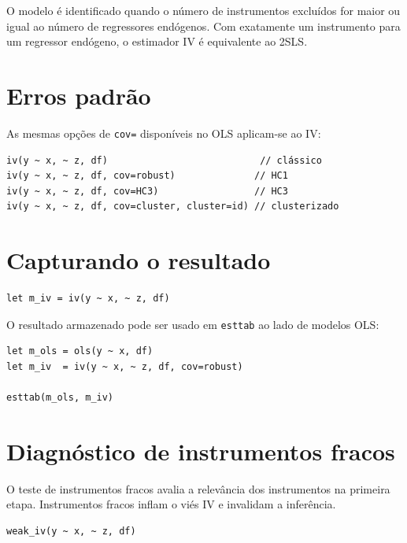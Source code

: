 \begin{nota}
  O modelo é identificado quando o número de instrumentos excluídos for maior ou
  igual ao número de regressores endógenos. Com exatamente um instrumento para um
  regressor endógeno, o estimador IV é equivalente ao 2SLS.
\end{nota}

\section{Erros padrão}

As mesmas opções de \lstinline{cov=} disponíveis no OLS aplicam-se ao IV:

\begin{lstlisting}
iv(y ~ x, ~ z, df)                           // clássico
iv(y ~ x, ~ z, df, cov=robust)              // HC1
iv(y ~ x, ~ z, df, cov=HC3)                 // HC3
iv(y ~ x, ~ z, df, cov=cluster, cluster=id) // clusterizado
\end{lstlisting}

\section{Capturando o resultado}

\begin{lstlisting}
let m_iv = iv(y ~ x, ~ z, df)
\end{lstlisting}

O resultado armazenado pode ser usado em \lstinline{esttab} ao lado de modelos OLS:

\begin{lstlisting}[caption={OLS versus IV na mesma tabela}]
let m_ols = ols(y ~ x, df)
let m_iv  = iv(y ~ x, ~ z, df, cov=robust)

esttab(m_ols, m_iv)
\end{lstlisting}

\section{Diagnóstico de instrumentos fracos}

O teste de instrumentos fracos avalia a relevância dos instrumentos na primeira etapa.
Instrumentos fracos inflam o viés IV e invalidam a inferência.

\begin{lstlisting}[caption={Teste de instrumentos fracos}]
weak_iv(y ~ x, ~ z, df)
\end{lstlisting}

